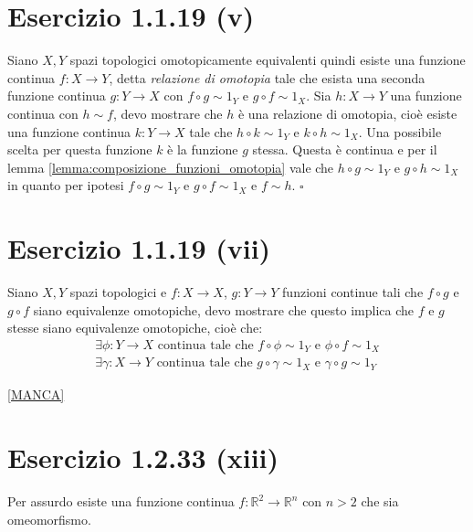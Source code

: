 \documentclass[10pt]{scrartcl}
\begin{document}
\section*{Esercizio 1.1.19 (v)}
Siano $ X, Y $ spazi topologici omotopicamente equivalenti quindi
esiste una funzione continua $ f \colon X \to Y $, detta
\emph{relazione di omotopia} tale che esista una seconda
funzione continua $ g \colon Y \to X $ con $ f \circ g \sim 1_Y $
e $ g \circ f \sim 1_X $. Sia $ h \colon X \to Y $ una funzione
continua con $ h \sim f $, devo mostrare che $ h $ è una
relazione di omotopia, cioè esiste una funzione continua
$ k \colon Y \to X $ tale che $ h \circ k \sim 1_Y $ e $ k \circ h \sim 1_X $.
Una possibile scelta per questa funzione $ k $ è la funzione
$ g $ stessa. Questa è continua e per il lemma \ref{lemma:composizione_funzioni_omotopia}
vale che $ h \circ g \sim 1_Y $ e $ g \circ h \sim 1_X $ in quanto per
ipotesi  $ f \circ g \sim 1_Y $ e $ g \circ f \sim 1_X $ e $ f \sim h $.
\hfill $ \square $

\section*{Esercizio 1.1.19 (vii)}
Siano $ X, Y $ spazi topologici e $ f \colon X \to X $,
$ g \colon Y \to Y $ funzioni continue tali che $ f \circ g $
e $ g \circ f $ siano equivalenze omotopiche, devo mostrare
che questo implica che $ f $ e $ g $ stesse siano
equivalenze omotopiche, cioè che:
\begin{gather*}
  \exists \phi \colon Y \to X \text{ continua tale che } f \circ \phi \sim 1_Y \text{ e } \phi \circ f \sim 1_X \\
  \exists \gamma \colon X \to Y \text{ continua tale che } g \circ \gamma \sim 1_X \text{ e } \gamma \circ g \sim 1_Y
\end{gather*}

\underline{[MANCA]}

\section*{Esercizio 1.2.33 (xiii)}
Per assurdo esiste una funzione continua $ f \colon \mathbb{R}^2 \to \mathbb{R}^n $
con $ n > 2 $ che sia omeomorfismo.
\end{document}
